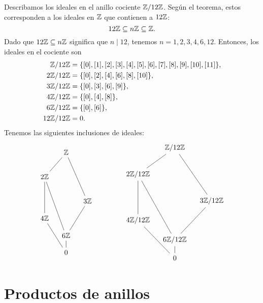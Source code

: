 \begin{ejemplo}
  Describamos los ideales en el anillo cociente $\mathbb{Z}/12\mathbb{Z}$. Según el teorema,
  estos corresponden a los ideales en $\mathbb{Z}$ que contienen a $12\mathbb{Z}$:
  $$12\mathbb{Z} \subseteq n\mathbb{Z} \subseteq \mathbb{Z}.$$
  Dado que $12\mathbb{Z} \subseteq n\mathbb{Z}$ significa que $n \mid 12$,
  tenemos $n = 1,2,3,4,6,12$.
  Entonces, los ideales en el cociente son
  \begin{align*}
    \mathbb{Z}/12\mathbb{Z} & = \{ [0], [1], [2], [3], [4], [5], [6], [7], [8], [9], [10], [11] \},\\
    2\mathbb{Z}/12\mathbb{Z} & = \{ [0], [2], [4], [6], [8], [10] \},\\
    3\mathbb{Z}/12\mathbb{Z} & = \{ [0], [3], [6], [9] \},\\
    4\mathbb{Z}/12\mathbb{Z} & = \{ [0], [4], [8] \},\\
    6\mathbb{Z}/12\mathbb{Z} & = \{ [0], [6] \},\\
    12\mathbb{Z}/12\mathbb{Z} & = 0.
  \end{align*}
  Tenemos las siguientes inclusiones de ideales:
  \[ \begin{tikzcd}[row sep=1em, column sep=1em]
      & \ZZ\ar[-]{ddl}\ar[-]{ddddr} \\
      \\
      2\ZZ\ar[-]{ddd}\ar[-]{ddddr} \\
      \\
      & & 3\ZZ\ar[-]{ddl} \\
      4\ZZ\ar[-]{ddr} \\
      & 6\ZZ\ar[-]{d} \\
      & 0
    \end{tikzcd}
    \quad\quad\quad\quad
    \begin{tikzcd}[row sep=1em, column sep=1em]
      & \ZZ/12\ZZ\ar[-]{ddl}\ar[-]{ddddr} \\
      \\
      2\ZZ/12\ZZ\ar[-]{ddd}\ar[-]{ddddr} \\
      \\
      & & 3\ZZ/12\ZZ\ar[-]{ddl} \\
      4\ZZ/12\ZZ\ar[-]{ddr} \\
      & 6\ZZ/12\ZZ\ar[-]{d} \\
      & 0
    \end{tikzcd} \]
\end{ejemplo}


\section{Productos de anillos}

